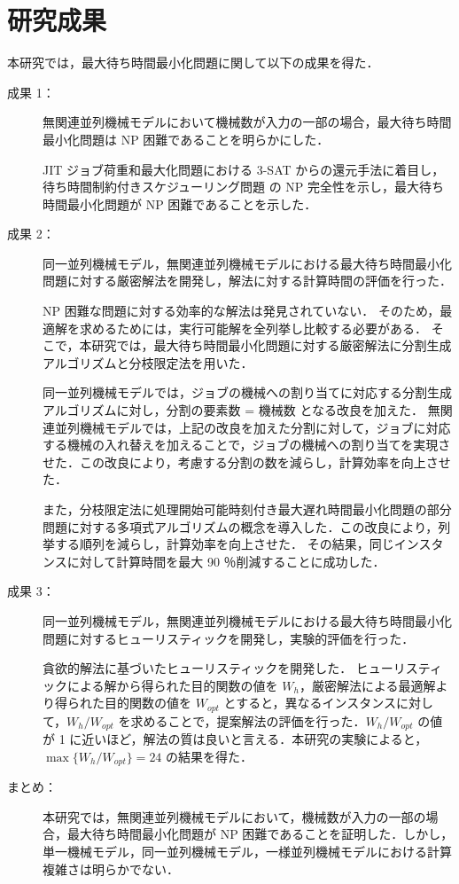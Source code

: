 \documentclass[12pt]{optlab-bachelor}
\begin{document}
\section{研究成果}
本研究では，最大待ち時間最小化問題に関して以下の成果を得た．
\begin{description}
  \item[成果 1：]
  無関連並列機械モデルにおいて機械数が入力の一部の場合，最大待ち時間最小化問題は NP 困難であることを明らかにした．

  JIT ジョブ荷重和最大化問題における \textsc{3-SAT} からの還元手法に着目し，待ち時間制約付きスケジューリング問題 の NP 完全性を示し，最大待ち時間最小化問題が NP 困難であることを示した．

  \item[成果 2：]
  同一並列機械モデル，無関連並列機械モデルにおける最大待ち時間最小化問題に対する厳密解法を開発し，解法に対する計算時間の評価を行った．

  NP 困難な問題に対する効率的な解法は発見されていない．
  そのため，最適解を求めるためには，実行可能解を全列挙し比較する必要がある．
  そこで，本研究では，最大待ち時間最小化問題に対する厳密解法に分割生成アルゴリズムと分枝限定法を用いた．

  同一並列機械モデルでは，ジョブの機械への割り当てに対応する分割生成アルゴリズムに対し，分割の要素数 = 機械数 となる改良を加えた．
  無関連並列機械モデルでは，上記の改良を加えた分割に対して，ジョブに対応する機械の入れ替えを加えることで，ジョブの機械への割り当てを実現させた．この改良により，考慮する分割の数を減らし，計算効率を向上させた．

  また，分枝限定法に処理開始可能時刻付き最大遅れ時間最小化問題の部分問題に対する多項式アルゴリズムの概念を導入した．この改良により，列挙する順列を減らし，計算効率を向上させた．
  その結果，同じインスタンスに対して計算時間を最大 90 ％削減することに成功した．

  \item[成果 3：]
  同一並列機械モデル，無関連並列機械モデルにおける最大待ち時間最小化問題に対するヒューリスティックを開発し，実験的評価を行った．

  貪欲的解法に基づいたヒューリスティックを開発した．
  ヒューリスティックによる解から得られた目的関数の値を $W_h$，厳密解法による最適解より得られた目的関数の値を $W_{opt}$ とすると，異なるインスタンスに対して，$W_h/W_{opt}$ を求めることで，提案解法の評価を行った．$W_h/W_{opt}$ の値が 1 に近いほど，解法の質は良いと言える．本研究の実験によると，$\max\big\{W_h/W_{opt}\big\} = 24$ の結果を得た．

  \item[まとめ：] 本研究では，無関連並列機械モデルにおいて，機械数が入力の一部の場合，最大待ち時間最小化問題が NP 困難であることを証明した．しかし，単一機械モデル，同一並列機械モデル，一様並列機械モデルにおける計算複雑さは明らかでない．
\end{description}
\end{document}
